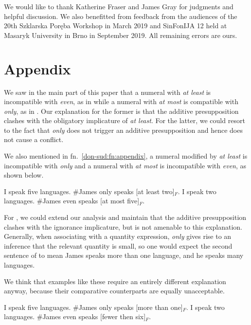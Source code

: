 \documentclass[output=paper]{langscibook}
\begin{document}
We would like to thank Katherine Fraser and James Gray for judgments and helpful discussion. We also benefitted from feedback from the audiences of the 20th Szklarska Poręba Workshop in March 2019 and SinFonIJA 12 held at Masaryk University in Brno in September 2019. All remaining errors are ours.


\section*{Appendix}\largerpage

We saw in the main part of this paper that a numeral with \textit{at least} is incompatible with \textit{even}, as in  while a numeral with \textit{at most} is compatible with \textit{only}, as in . Our explanation for the former is that the additive presupposition clashes with the obligatory implicature of \textit{at least}. For the latter, we could resort to the fact that \textit{only} does not trigger an additive presupposition and hence does not cause a conflict.

We also mentioned in fn.~\ref{don-sud:fn:appendix}, a numeral modified by \textit{at least} is incompatible with \textit{only} and a numeral with \textit{at most} is incompatible with \textit{even}, as shown below.

\ea
  \ea I speak five languages. \#James only speaks [at least two]$_F$.\label{don-sud:onlyatleast}
  \ex I speak two languages. \#James even speaks [at most five]$_F$.\label{don-sud:evenatmost}
  \z
\z

\noindent For , we could extend our analysis and maintain that the additive presupposition clashes with the ignorance implicature, but  is not amenable to this explanation. Generally, when associating with a quantity expression, \textit{only} gives rise to an inference that the relevant quantity is small, so one would expect the second sentence of  to mean James speaks more than one language, and he speaks many languages.

We think that examples like these require an entirely different explanation anyway, because their comparative counterparts are equally unacceptable.

\ea
  \ea I speak five languages. \#James only speaks [more than one]$_F$.\label{don-sud:onlymore}
  \ex I speak two languages. \#James even speaks [fewer then six]$_F$.\label{don-sud:evenfewer}
  \z
\z
\end{document}
